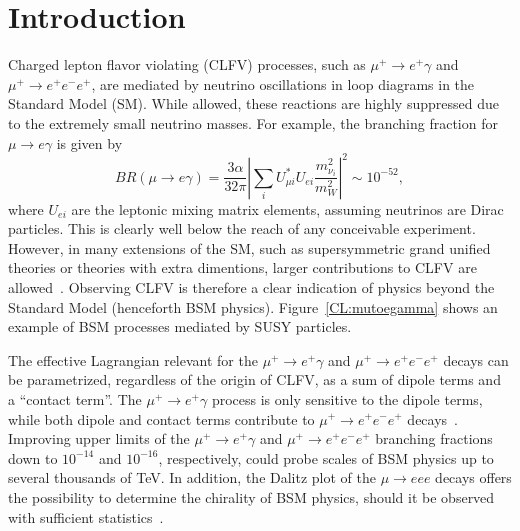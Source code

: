 \section{Introduction}
\label{sec:intro}

Charged lepton flavor violating (CLFV) processes, such as 
$\mu^+\to e^+\gamma$ and $\mu^+\to e^+e^-e^+$, are mediated by neutrino oscillations in loop diagrams in the Standard Model (SM). While allowed, these reactions are highly suppressed due to the extremely small neutrino masses. For example, the branching fraction for $\mu \to e \gamma$ is given by%
\begin{equation}
BR(\mu \rightarrow e \gamma)=\frac{3\alpha}{32\pi}\left|\sum_i U_{\mu
i}^* U_{e i}\frac{m_{\nu_{i}}^2}{m_{W}^2}\right|^2 \sim 10^{-52},
\end{equation}
where $U_{ei}$ are the leptonic mixing matrix elements, assuming neutrinos
are Dirac particles. This is clearly well below the reach of any conceivable experiment.
However, in many extensions of the SM, such as supersymmetric grand unified
theories or theories with extra dimentions, larger contributions to CLFV are
allowed~\cite{new physics}. Observing CLFV is therefore a clear indication of physics beyond the Standard Model (henceforth BSM physics). Figure~\ref{CL:mutoegamma} shows an example of BSM processes mediated by SUSY particles.

The effective Lagrangian relevant for the $\mu^+\to e^+\gamma$ and $\mu^+\to e^+e^-e^+$
decays can be parametrized, regardless of the origin of CLFV, as a sum of
dipole terms and a ``contact term''. The $\mu^+\to e^+\gamma$ process is only sensitive to the dipole terms, while both dipole and contact terms contribute to $\mu^+\to e^+e^-e^+$ decays~\cite{deGouvea:2013zba}. Improving upper limits of
the $\mu^+\to e^+\gamma$ and $\mu^+\to e^+e^-e^+$ branching fractions down to $10^{-14}$ and $10^{-16}$, respectively, could probe scales of BSM physics up to several thousands of TeV. In addition, the Dalitz plot of the $\mu \rightarrow eee$ decays offers the possibility to determine the chirality of BSM physics, should it be observed with sufficient statistics~\cite{Okada:1999zk}. 

